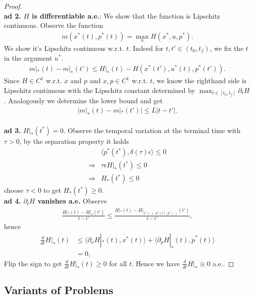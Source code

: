 \begin{proof}
\quad\\
\textbf{ad 2. $H$ is differentiable a.e.}: We show that the function is Lipschitz continuous. Observe the function
\begin{align*}
	m(x^*(t), p^*(t)) = \max_u H(x^*, u, p^*).
\end{align*}
We show it's Lipschitz continuous w.r.t. $t$. Indeed for $t, t' \in (t_0, t_f)$, we fix the $t$ in the argument $u^*$.  
\begin{align*}
	m|_*(t) - m|_*(t') \le H|_*(t) - H(x^*(t'), u^*(t), p^*(t')).
\end{align*}
Since $H \in C^1$ w.r.t. $x$ and $p$ and $x, p \in C^1$ w.r.t. $t$, we know the righthand side is Lipschitz continuous with the Lipschitz constant determined by $\max_{t \in [t_0, t_f]} \partial_t H$. Analogously we determine the lower bound and get 
\begin{align*}
	|m|_*(t) - m|_*(t')| \le L |t - t'|. 
\end{align*}
\quad\\
\textbf{ad 3.} $H|_*(t^*) = 0$. Observe the temporal variation at the terminal time with $\tau > 0$, by the separation property it holds
\begin{align*}
	& \langle p^*(t^*), \delta(\tau) \epsilon \rangle \le 0\\
	\Rightarrow & \tau \epsilon H|_*(t^*) \le 0 \\
	\Rightarrow & H_*(t^*) \le 0
\end{align*}
choose $\tau < 0$ to get $H_*(t^*) \ge 0$. 
\quad\\
\textbf{ad 4. $\partial_t H$ vanishes a.e.} Observe
\begin{align*}
	\frac{H|_*(t) - H|_*(t')}{t - t'} \le \frac{ H|_*(t) - H|_{x^*(\cdot), u^*(t), p^*(\cdot)}(t')}{t - t'},
\end{align*}
hence
\begin{align*}
	\frac{d}{dt} H|_*(t) &\le \langle \partial_x H|_*(t), \dot{x^*}(t) \rangle + \langle \partial_pH|_*(t), \dot{p}^*(t) \rangle \\
	&= 0,
\end{align*}
Flip the sign to get $\frac{d}{dt}H|_*(t) \ge 0$ for all $t$. Hence we have $\frac{d}{dt}H|_* \equiv 0$ a.e.. 
\end{proof}

\subsection{Variants of Problems}
